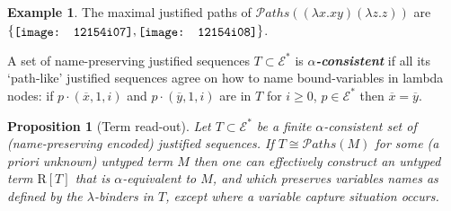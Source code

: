 \documentclass[xchauthor,chkrefs,GCNS,amsmath,amsthm,rotating,leaveRGB]{tcsg}
\renewcommand{\index}[1]{}
\theoremstyle{plain}
\newtheorem{proposition}[theorem]{Proposition}
\theoremstyle{definition}
\newtheorem{example}{Example}[section]
\def\structisomorphic{\cong}
\def\readout{\mathrm{R}}
\def\nameencoding{\mathcal{E}}
\newcommand{\pathset}{{\mathcal{P}aths}}
\begin{document}
\begin{example}
The maximal justified paths of $\pathset ((\lambda x.x y) (\lambda z.z))$ are
$\{\raisebox{-1pt}{\texttt{[image: 12154i07]}},\raisebox{-1pt}{\texttt{[image: 12154i08]}}\}$.
\end{example}

A set of name-preserving justified sequences $T\subset \nameencoding ^{*}$ is
\textbf{\emph{$\alpha  $-consistent}}\index{$\alpha  $-consistent} if all its
`path-like' justified sequences agree on how to name bound-variables in
lambda nodes: if $p \cdot (\overline{x}, 1, i)$ and $p \cdot (\overline{y},
1, i)$ are in $T$ for $i\geq 0$, $p\in \nameencoding ^{*}$ then $\overline{x}
= \overline{y}$.

\begin{proposition}[Term read-out]\label{proposition:termtree_readout_from_justitied_paths}
Let $T\subset \nameencoding ^{*}$ be a finite $\alpha $-consistent set of
(name-preserving encoded) justified sequences. If $T\structisomorphic
\pathset (M)$ for some (a priori unknown) untyped term $M$ then one can
effectively construct an untyped term  $\readout [T]$ that is $\alpha
$-equivalent to $M$, and which preserves variables names as defined by the
$\lambda $-binders in $T$, except where a variable capture situation occurs.
\end{proposition}
\end{document}
